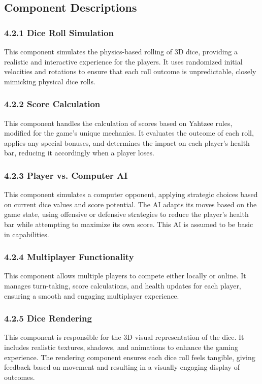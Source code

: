 \documentclass{article}
\begin{document}
\subsection{Component Descriptions}

\subsubsection*{4.2.1 Dice Roll Simulation}
This component simulates the physics-based rolling of 3D dice, providing a realistic and interactive experience for the players. It uses randomized initial velocities and rotations to ensure that each roll outcome is unpredictable, closely mimicking physical dice rolls.

\subsubsection*{4.2.2 Score Calculation}
This component handles the calculation of scores based on Yahtzee rules, modified for the game's unique mechanics. It evaluates the outcome of each roll, applies any special bonuses, and determines the impact on each player's health bar, reducing it accordingly when a player loses.

\subsubsection*{4.2.3 Player vs. Computer AI}
This component simulates a computer opponent, applying strategic choices based on current dice values and score potential. The AI adapts its moves based on the game state, using offensive or defensive strategies to reduce the player's health bar while attempting to maximize its own score. This AI is assumed to be basic in capabilities.

\subsubsection*{4.2.4 Multiplayer Functionality}
This component allows multiple players to compete either locally or online. It manages turn-taking, score calculations, and health updates for each player, ensuring a smooth and engaging multiplayer experience.

\subsubsection*{4.2.5 Dice Rendering}
This component is responsible for the 3D visual representation of the dice. It includes realistic textures, shadows, and animations to enhance the gaming experience. The rendering component ensures each dice roll feels tangible, giving feedback based on movement and resulting in a visually engaging display of outcomes.
\end{document}
